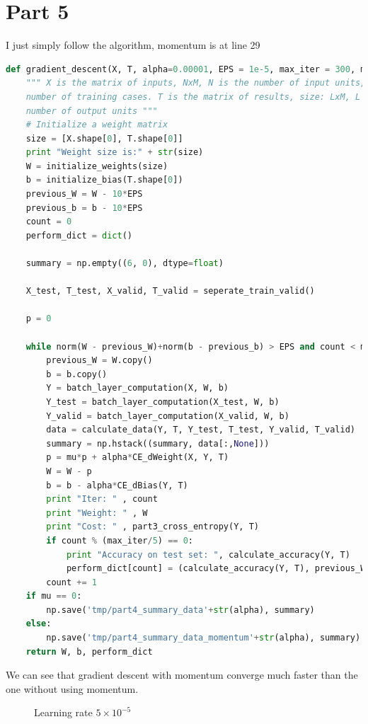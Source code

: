\documentclass[12pt]{article}
\begin{document}
\section*{Part 5}
I just simply follow the algorithm, momentum is at line 29
\begin{lstlisting}[language=Python]
def gradient_descent(X, T, alpha=0.00001, EPS = 1e-5, max_iter = 300, mu = 0):
    """ X is the matrix of inputs, NxM, N is the number of input units, M is the 
    number of training cases. T is the matrix of results, size: LxM, L is the 
    number of output units """
    # Initialize a weight matrix
    size = [X.shape[0], T.shape[0]]
    print "Weight size is:" + str(size)
    W = initialize_weights(size)
    b = initialize_bias(T.shape[0])
    previous_W = W - 10*EPS
    previous_b = b - 10*EPS
    count = 0
    perform_dict = dict()

    summary = np.empty((6, 0), dtype=float)

    X_test, T_test, X_valid, T_valid = seperate_train_valid()

    p = 0
    
    while norm(W - previous_W)+norm(b - previous_b) > EPS and count < max_iter:
        previous_W = W.copy()
        b = b.copy()
        Y = batch_layer_computation(X, W, b)
        Y_test = batch_layer_computation(X_test, W, b)
        Y_valid = batch_layer_computation(X_valid, W, b)
        data = calculate_data(Y, T, Y_test, T_test, Y_valid, T_valid)
        summary = np.hstack((summary, data[:,None]))
        p = mu*p + alpha*CE_dWeight(X, Y, T)
        W = W - p
        b = b - alpha*CE_dBias(Y, T)
        print "Iter: " , count
        print "Weight: " , W
        print "Cost: " , part3_cross_entropy(Y, T)
        if count % (max_iter/5) == 0:
            print "Accuracy on test set: ", calculate_accuracy(Y, T)
            perform_dict[count] = (calculate_accuracy(Y, T), previous_W, previous_b)
        count += 1
    if mu == 0:
        np.save('tmp/part4_summary_data'+str(alpha), summary)
    else:
        np.save('tmp/part4_summary_data_momentum'+str(alpha), summary)
    return W, b, perform_dict
\end{lstlisting}
We can see that gradient descent with momentum converge much faster than the one without using momentum.
\begin{figure}[h]
    \qquad
    \caption{Learning rate $5\times 10^{-5}$}
\end{figure}
\end{document}
